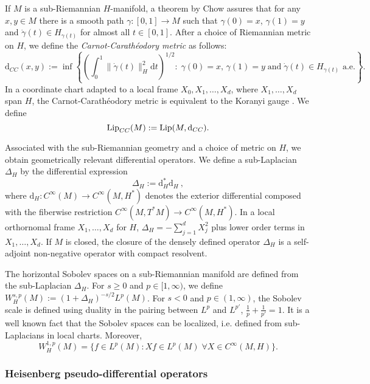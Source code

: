 \documentclass[10pt]{amsart}
\theoremstyle{remark}
\theoremstyle{definition}
\begin{document}
If $M$ is a sub-Riemannian $H$-manifold, a theorem by Chow assures that for any $x,y\in M$ there is a smooth path $\gamma:[0,1]\to M$ such that $\gamma(0)=x$, $\gamma(1)=y$ and $\dot{\gamma}(t)\in H_{\gamma(t)}$ for almost all $t\in [0,1]$. After a choice of Riemannian metric on $H$, we define the \emph{Carnot-Carath\'eodory metric} as follows:
\small
\begin{equation}
\label{dcccddeef}
{\mathrm{d}}_{CC}(x,y):=\inf\left\{\left(\int_0^1\|\dot{\gamma}(t)\|_H^2{\mathrm{d}} t\right)^{1/2}:\;\gamma(0)=x,\, \gamma(1)=y\;\mbox{and}\;\dot{\gamma}(t)\in H_{\gamma(t)}\mbox{  a.e.}\right\}.
\end{equation}
\normalsize
In a coordinate chart adapted to a local frame $X_0, X_1, \dots, X_d$, where $X_1, \dots, X_d$ span $H$, the Carnot-Carath\'eodory metric is equivalent to the Koranyi gauge \cite[Lemma 2.6]{gimpgoff}. We define 
$${\textnormal{Lip}}_{CC}(M):={\textnormal{Lip}}(M,{\mathrm{d}}_{CC}).$$

Associated with the sub-Riemannian geometry and a choice of metric on $H$, we obtain geometrically relevant differential operators. We define a sub-Laplacian $\Delta_H$  by the differential expression 
\[\Delta_H:={\mathrm{d}}_H^* {\mathrm{d}}_H\ ,\]
where ${\mathrm{d}}_H:C^\infty(M)\to C^\infty(M,H^*)$ denotes the exterior differential composed with the fiberwise restriction $C^\infty(M,T^*M)\to C^\infty(M,H^*)$. In a local orthornomal frame $X_1, \dots, X_d$ for $H$, $\Delta_H=-\sum_{j=1}^d X_j^2$ plus lower order terms in $X_1, \dots, X_d$. If $M$ is closed, the closure of the densely defined operator $\Delta_H$ is a self-adjoint non-negative operator with compact resolvent.
 
The horizontal Sobolev spaces on a sub-Riemannian manifold are defined from the sub-Laplacian $\Delta_H$. For $s\geq 0$ and $p\in [1,\infty)$, we define $W^{s,p}_H(M):=(1+\Delta_H)^{-s/2}L^p(M)$. For $s<0$ and $p\in (1,\infty)$, the Sobolev scale is defined using duality in the pairing between $L^p$ and $L^{p'}$, $\frac{1}{p}+\frac{1}{p'}=1$. It is a well known fact that the Sobolev spaces can be localized, i.e. defined from sub-Laplacians in local charts. Moreover, 
\begin{equation}
\label{horizontalestimaate}
W^{1,p}_H(M)=\{f\in L^p(M): Xf\in L^p(M)\;\forall X\in C^\infty(M,H)\}.
\end{equation}

 

\subsubsection{Heisenberg pseudo-differential operators}
\label{Heisenbergcalc}
\end{document}
